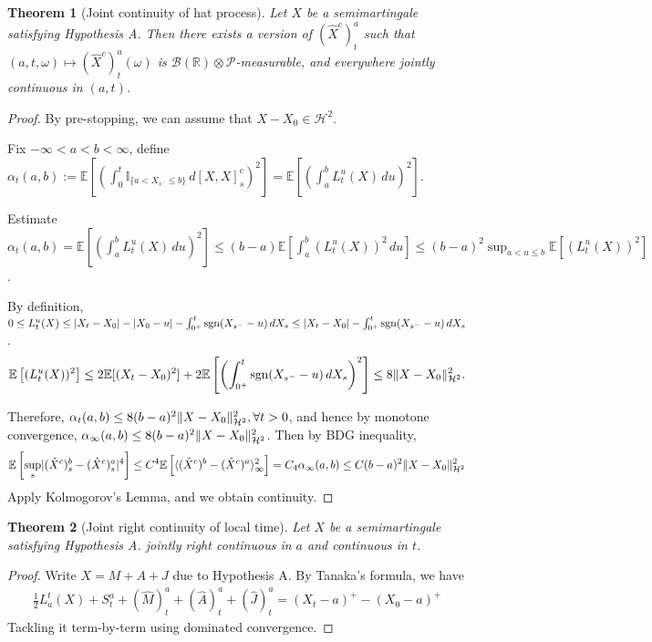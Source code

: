 \documentclass[openany,oneside]{book}
\newtheorem{thm}{Theorem}[section]
\theoremstyle{definition}
\theoremstyle{remark}
\newcommand{\E}{\mathbb{E}} %
\newcommand{\I}{\mathbb{I}} %
\DeclarePairedDelimiter{\abs}{\lvert}{\rvert} %
\DeclarePairedDelimiter{\norm}{\lVert}{\rVert} %
\newcommand{\sH}[1][2]{\mathcal{H}^{#1}} %
\newcommand{\pred}{\mathcal{P}} %
\begin{document}
\begin{thm}[Joint continuity of hat process]
Let $X$ be a semimartingale satisfying Hypothesis A. Then there exists a version of $(\hat{X}^c)^a_t$ such that $(a,t,\omega) \mapsto (\hat{X}^c)^a_t(\omega)$ is $\mathcal{B}(\mathbb{R}) \otimes \pred$-measurable, and everywhere jointly continuous in $(a,t)$.
\end{thm}
\begin{proof}
By pre-stopping, we can assume that $X-X_0 \in \sH$.
\par
Fix $-\infty < a < b < \infty$, define $\alpha_t(a,b) := \E\left[\left(\int_0^t \I_{\{a< X_{s^-}\le b\}} \,d [X,X]^c_s \right)^2 \right] = \E\left[\left(\int_a^b L^u_t(X) \,d u\right)^2 \right]$.
\par
Estimate $\alpha_t(a,b) = \E\left[\left(\int_a^b L^u_t(X) \,d u\right)^2 \right] \le (b-a) \E\left[ \int_a^b (L^u_t(X))^2 \,d u\right] \le (b-a)^2 \sup_{a<u\le b} \E\left[(L^u_t(X))^2 \right]$.
\par
By definition, $0\le L^u_t(X) \le \abs{X_t-X_0} - \abs{X_0-u} - \int_{0^+}^t {\rm sgn}(X_{s^-}-u) \,d X_s \le \abs{X_t-X_0} - \int_{0^+}^t {\rm sgn}(X_{s^-}-u) \,d X_s$.
\begin{align*}
\E\left[(L^u_t(X))^2\right] \le 2\E[(X_t-X_0)^2] + 2\E\left[\left(\int_{0^+}^t {\rm sgn}(X_{s^-}-u) \,d X_s\right)^2 \right] \le 8\norm{X-X_0}^2_{\sH}.
\end{align*}

Therefore, $\alpha_t(a,b) \le 8(b-a)^2 \norm{X-X_0}^2_{\sH}, \forall t>0$, and hence by monotone convergence, $\alpha_\infty(a,b) \le 8(b-a)^2 \norm{X-X_0}^2_{\sH}$. Then by BDG inequality,
\begin{align*}
\E\left[\sup_s \abs{(\hat{X}^c)^b_s - (\hat{X}^c)^a_s}^4 \right] \le C^4 \E\left[\langle (\hat{X}^c)^b - (\hat{X}^c)^a \rangle^2_\infty \right] = C_4 \alpha_\infty(a,b) \le C(b-a)^2\norm{X-X_0}^2_{\sH}
\end{align*}
Apply Kolmogorov's Lemma, and we obtain continuity.
\end{proof}


\begin{thm}[Joint right continuity of local time]
Let $X$ be a semimartingale satisfying Hypothesis A. jointly right continuous in $a$ and continuous in $t$.
\end{thm}
\begin{proof}
Write $X=M+A+J$ due to Hypothesis A. By Tanaka's formula, we have
\begin{align*}
\frac{1}{2}L^t_a(X) + S^a_t + (\hat{M})^a_t + (\hat{A})^a_t + (\hat{J})^a_t = (X_t-a)^+ - (X_0-a)^+
\end{align*}
Tackling it term-by-term using dominated convergence.
\end{proof}
\end{document}
